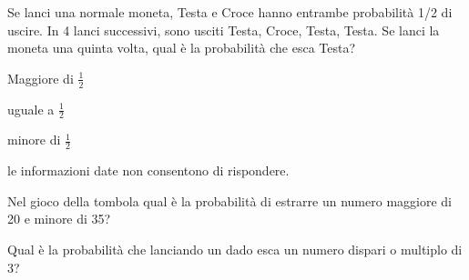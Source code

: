 \begin{esercizio} %
Se lanci una normale moneta, Testa e Croce hanno entrambe probabilità 1/2 di 
uscire. In 4 lanci successivi, sono usciti Testa, Croce, Testa, Testa. Se lanci 
la moneta una quinta volta, qual è la probabilità che esca Testa?
\begin{itemize*}
\item Maggiore di \( \frac 1 2 \)
\item uguale a \( \frac 1 2 \)
\item minore di \( \frac 1 2 \)
\item le informazioni date non consentono di rispondere.
\end{itemize*}
\end{esercizio}

\begin{esercizio} %
Nel gioco della tombola qual è la probabilità di estrarre un numero maggiore di 
20 e minore di 35?
\end{esercizio}

\begin{esercizio} %
Qual è la probabilità che lanciando un dado esca un numero dispari o multiplo di 
3?
\end{esercizio}
